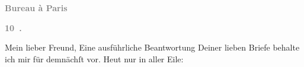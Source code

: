 \pstart
           \begin{otherlanguage}{french}\textcolor{gray}{\textbf{\textbf{Bureau à Paris}}}\end{otherlanguage}\pend
           
\pstart
           \begin{otherlanguage}{french}\textcolor{gray}{\textbf{\textbf{10 .}}}\end{otherlanguage}\pend
           
\pstart\center{}Mein lieber Freund,\pend\vspace{0.5em}
\pstart
           Eine ausführliche Beantwortung Deiner lieben Briefe behalte ich mir für demnächſt
               vor. Heut nur in aller Eile:\pend
           
